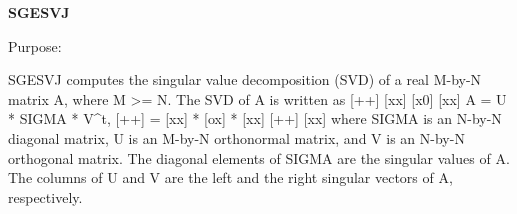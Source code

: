 {\bfseries S\+G\+E\+S\+V\+J} 

 \begin{DoxyParagraph}{Purpose\+: }
\begin{DoxyVerb} SGESVJ computes the singular value decomposition (SVD) of a real
 M-by-N matrix A, where M >= N. The SVD of A is written as
                                    [++]   [xx]   [x0]   [xx]
              A = U * SIGMA * V^t,  [++] = [xx] * [ox] * [xx]
                                    [++]   [xx]
 where SIGMA is an N-by-N diagonal matrix, U is an M-by-N orthonormal
 matrix, and V is an N-by-N orthogonal matrix. The diagonal elements
 of SIGMA are the singular values of A. The columns of U and V are the
 left and the right singular vectors of A, respectively.\end{DoxyVerb}
 
\end{DoxyParagraph}


